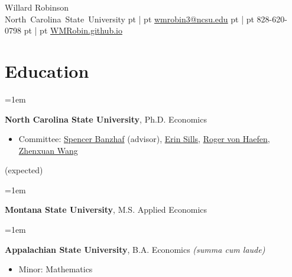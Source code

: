\documentclass[12pt]{article}
\newenvironment{highlights}{
	\begin{itemize}[
		topsep=0.10 cm,
		partopsep=0pt,
		leftmargin=0.3 cm + 10pt,
		label={}
		]
	\setlength{\parsep}{0.10cm}\setlength{\itemsep}{0pt}
	}{
	\end{itemize}
}
\newenvironment{twocolentry}[2][]{%
	\par\noindent\def\secondColumn{#2}%
	\begin{minipage}[t]{\linewidth-5.1cm}\raggedright\hangindent=1em\hangafter=1\relax%
	}
	{%
		\end{minipage}\hfill%
		\begin{minipage}[t]{5cm}\raggedleft\secondColumn\end{minipage}\par\smallskip
	}
\newenvironment{header}{
	\setlength{\topsep}{0pt}\par\kern\topsep\centering\linespread{1.5}
}{
	\par\kern\topsep
}
\newcommand{\AND}{\unskip\hspace{5pt}|\hspace{5pt}\ignorespaces}
\begin{document}

\begin{header}
	{\fontsize{20 pt}{15 pt}\selectfont Willard Robinson} \\
	\small
	\mbox{North Carolina State University}%
	 pt%
	\AND%
	 pt%
	\mbox{\href{mailto:wmrobin3@ncsu.edu}{wmrobin3@ncsu.edu}}%
	 pt%
	\AND%
	 pt%
	\mbox{828-620-0798}%
	 pt%
	\AND%
	 pt%
	\mbox{\href{https://WMRobin.github.io/}{WMRobin.github.io}}%
\end{header}

\vspace{-1ex}

\section{Education}

\begin{twocolentry}{2027 (expected)}
	\textbf{North Carolina State University}, Ph.D. Economics
	\vspace{-0.5ex}
	\begin{highlights}
		\item \small Committee:
		\href{https://spencerbanzhaf.wordpress.ncsu.edu/}{Spencer Banzhaf} (advisor),
		\href{https://cnr.ncsu.edu/directory/erin-o-sills/}{Erin Sills},
		\href{https://rvhaefen.wordpress.ncsu.edu/}{Roger von Haefen},
		\href{https://www.zhenxuanwang.org/}{Zhenxuan Wang}
	\end{highlights}
\end{twocolentry}

\begin{twocolentry}{2022}
	\textbf{Montana State University}, M.S. Applied Economics
\end{twocolentry}

\begin{twocolentry}{2020}
	\textbf{Appalachian State University}, B.A. Economics
	\emph{\footnotesize (summa cum laude)}
	\vspace{-0.5ex}
	\begin{highlights}
		\item \small Minor: Mathematics
	\end{highlights}
\end{twocolentry}
\end{document}

